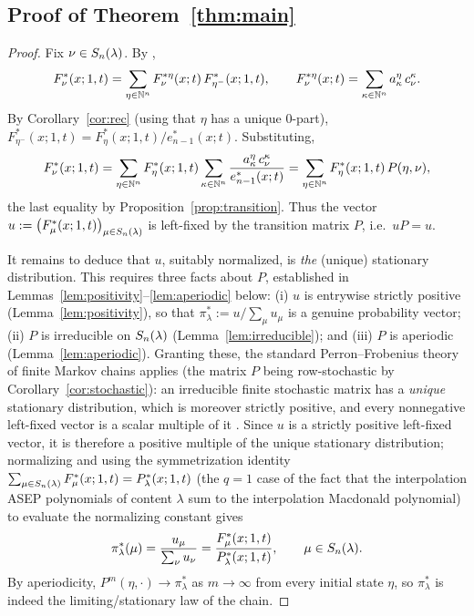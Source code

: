 \subsection*{Proof of Theorem~\ref{thm:main}}

\begin{proof}
Fix $\nu\in S_n(\lambda)$. By \cite[Thm.~1.15, Lem.~5.6]{BDW25a},
\[
F^*_\nu(x;1,t)=\sum_{\eta\in\mathbb{N}^n}F^{*\eta}_\nu(x;t)\,F^*_{\eta^-}(x;1,t),
\qquad
F^{*\eta}_\nu(x;t)=\sum_{\kappa\in\mathbb{N}^n}a^\eta_\kappa\,c^\kappa_\nu .
\]
By Corollary~\ref{cor:rec} (using that $\eta$ has a unique $0$-part),
$F^*_{\eta^-}(x;1,t)=F^*_\eta(x;1,t)/e^*_{n-1}(x;t)$. Substituting,
\[
F^*_\nu(x;1,t)=\sum_{\eta\in\mathbb{N}^n}F^*_\eta(x;1,t)\sum_{\kappa\in\mathbb{N}^n}
\frac{a^\eta_\kappa\,c^\kappa_\nu}{e^*_{n-1}(x;t)}
=\sum_{\eta\in\mathbb{N}^n}F^*_\eta(x;1,t)\,P(\eta,\nu),
\]
the last equality by Proposition~\ref{prop:transition}. Thus the vector
$u:=\bigl(F^*_\mu(x;1,t)\bigr)_{\mu\in S_n(\lambda)}$ is left-fixed by the transition
matrix $P$, i.e.\ $uP=u$.

It remains to deduce that $u$, suitably normalized, is \emph{the} (unique)
stationary distribution. This requires three facts about $P$, established in
Lemmas~\ref{lem:positivity}--\ref{lem:aperiodic} below: (i) $u$ is entrywise
strictly positive (Lemma~\ref{lem:positivity}), so that $\pi^*_\lambda:=u/\!\sum_\mu u_\mu$
is a genuine probability vector; (ii) $P$ is irreducible on $S_n(\lambda)$
(Lemma~\ref{lem:irreducible}); and (iii) $P$ is aperiodic
(Lemma~\ref{lem:aperiodic}). Granting these, the standard Perron--Frobenius theory
of finite Markov chains applies (the matrix $P$ being row-stochastic by
Corollary~\ref{cor:stochastic}): an irreducible finite stochastic matrix has a
\emph{unique} stationary distribution, which is moreover strictly positive, and
every nonnegative left-fixed vector is a scalar multiple of it
\cite[Thm.~1.5.6, Thm.~1.7.7]{Norris}. Since $u$ is a strictly positive
left-fixed vector, it is therefore a positive multiple of the unique stationary
distribution; normalizing and using the symmetrization identity
$\sum_{\mu\in S_n(\lambda)}F^*_\mu(x;1,t)=P^*_\lambda(x;1,t)$ (the $q=1$ case of the
fact that the interpolation ASEP polynomials of content $\lambda$ sum to the
interpolation Macdonald polynomial) to evaluate the normalizing constant gives
\[
\pi^*_\lambda(\mu)=\frac{u_\mu}{\sum_{\nu}u_\nu}
=\frac{F^*_\mu(x;1,t)}{P^*_\lambda(x;1,t)},\qquad \mu\in S_n(\lambda) .
\]
By aperiodicity, $P^m(\eta,\cdot)\to\pi^*_\lambda$ as $m\to\infty$ from every
initial state $\eta$, so $\pi^*_\lambda$ is indeed the limiting/stationary law of
the chain.
\end{proof}

